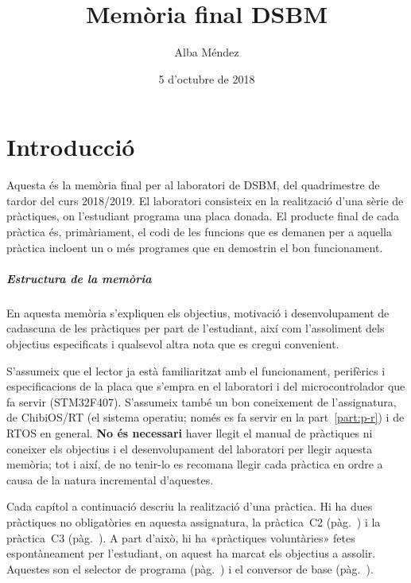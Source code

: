 \documentclass[catalan,parskip=half*,oneside,DIV=11,hidelinks]{scrreprt}
\let\myTOC\tableofcontents
\renewcommand\tableofcontents{%
  \pdfbookmark[1]{\contentsname}{}
  \myTOC }
\begin{document}
\title{Memòria final DSBM}
\date{5 d'octubre de 2018}
\author{Alba Méndez}

\maketitle

\tableofcontents
\listoffigures
\clearpage


\chapter{Introducció}

Aquesta és la memòria final per al laboratori de DSBM, del quadrimestre de tardor del curs 2018/2019.
El laboratori consisteix en la realització d'una sèrie de pràctiques, on l'estudiant programa una
placa donada. El producte final de cada pràctica és, primàriament, el codi de les funcions que es
demanen per a aquella pràctica incloent un o més programes que en demostrin el bon funcionament.

\paragraph{Estructura de la memòria}

En aquesta memòria s'expliquen els objectius, motivació i desenvolupament de cadascuna de les
pràctiques per part de l'estudiant, així com l'assoliment dels objectius especificats i qualsevol
altra nota que es cregui convenient.

S'assumeix que el lector ja està familiaritzat amb el funcionament, perifèrics i especificacions
de la placa que s'empra en el laboratori i del microcontrolador que fa servir (STM32F407).
S'assumeix també un bon coneixement de l'assignatura, de ChibiOS/RT (el sistema operatiu;
només es fa servir en la part~\ref{part:p-r}) i de RTOS en general.
\textbf{No és necessari} haver llegit el manual de pràctiques ni coneixer els objectius i el
desenvolupament del laboratori per llegir aquesta
memòria; tot i així, de no tenir-lo es recomana llegir cada pràctica en ordre a causa de la natura
incremental d'aquestes.

Cada capítol a continuació descriu la realització d'una pràctica. Hi ha dues pràctiques no
obligatòries en aquesta assignatura, la pràctica~C2 (pàg.~\pageref{ch:c2}) i la pràctica~C3
(pàg.~\pageref{ch:c3}). A part d'això, hi ha «pràctiques voluntàries» fetes espontàneament per
l'estudiant, on aquest ha marcat els objectius a assolir. Aquestes son el selector de programa
(pàg.~\pageref{ch:selector}) i el conversor de base (pàg.~\pageref{ch:basecvt}).
\end{document}
